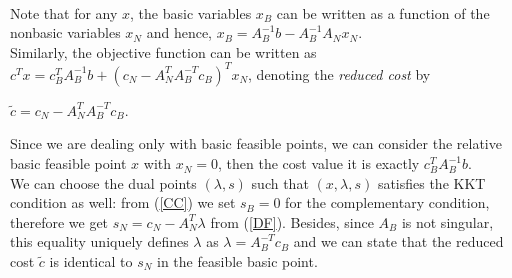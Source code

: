 \documentclass[a4paper,10 pt,titlepage,twoside]{report}
\theoremstyle{plain}
\theoremstyle{definition}
\theoremstyle{remark}
\begin{document}
 \\Note that for any $x$, the basic variables $x_{B}$ can be written as a function of the nonbasic variables $x_{N}$ and hence, $x_{B}=A_{B}^{-1}b-A_{B}^{-1}A_{N}x_{N}$. \\Similarly, the objective function can be written as $c^{T}x=c_{B}^{T}A_{B}^{-1}b+(c_{N}-A_{N}^{T}A_{B}^{-T}c_{B})^{T}x_{N}$, denoting the \textit{reduced cost} by \begin{center}
 	$\widetilde{c}=c_{N}-A_{N}^{T}A_{B}^{-T}c_{B}$.
 \end{center}Since we are dealing only with basic feasible points, we can consider the relative basic feasible point $x$ with $x_{N}= 0$, then the cost value it is exactly $c_{B}^{T}A_{B}^{-1}b$.\\
 We can choose the dual points $(\lambda,s)$ such that $(x, \lambda, s)$ satisfies the KKT condition as well: from (\ref{CC}) we set $s_{B}= 0$ for the complementary condition, therefore we get $s_{N}= c_{N}- A_{N}^{T}\lambda$ from (\ref{DF}). Besides, since $A_{B}$ is not singular, this equality uniquely defines $\lambda$ as $\lambda = A_{B}^{-T}c_{B}$ and we can state that the reduced cost $\tilde{c}$ is identical to $s_{N}$ in the feasible basic point.\\  
 
\end{document}
